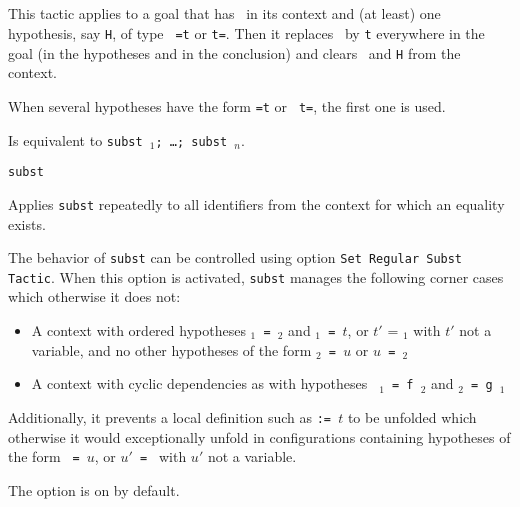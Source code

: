 \subsection{}

This tactic applies to a goal that has \ident\ in its context and
(at least) one hypothesis, say {\tt H}, of type {\tt
  \ident=t} or {\tt t=\ident}. Then it replaces
\ident\ by {\tt t} everywhere in the goal (in the hypotheses
and in the conclusion) and clears \ident\ and {\tt H} from the context.

\Rem
When several hypotheses have the form {\tt \ident=t} or {\tt
  t=\ident}, the first one is used.

\begin{Variants}
  \item {}

    Is equivalent to {\tt subst \ident$_1$; \dots; subst \ident$_n$}.
  \item {\tt subst}

    Applies {\tt subst} repeatedly to all identifiers from the context
    for which an equality exists.

 The behavior of {\tt subst} can be controlled using option {\tt Set
    Regular Subst Tactic}. When this option is activated, {\tt subst}
  manages the following corner cases which otherwise it
  does not:
\begin{itemize}
\item A context with ordered hypotheses {\tt \ident$_1$ = \ident$_2$}
  and {\tt \ident$_1$ = $t$}, or {$t'$ = \ident$_1$} with $t'$ not a
  variable, and no other hypotheses of the form {\tt \ident$_2$ = $u$}
  or {\tt $u$ = \ident$_2$}
\item A context with cyclic dependencies as with hypotheses {\tt
  \ident$_1$ = f~\ident$_2$} and {\tt \ident$_2$ = g~\ident$_1$}
\end{itemize}
Additionally, it prevents a local definition such as {\tt \ident :=
  $t$} to be unfolded which otherwise it would exceptionally unfold in
configurations containing hypotheses of the form {\tt {\ident} = $u$},
or {\tt $u'$ = \ident} with $u'$ not a variable.

The option is on by default.

\end{Variants}

\subsection{}

